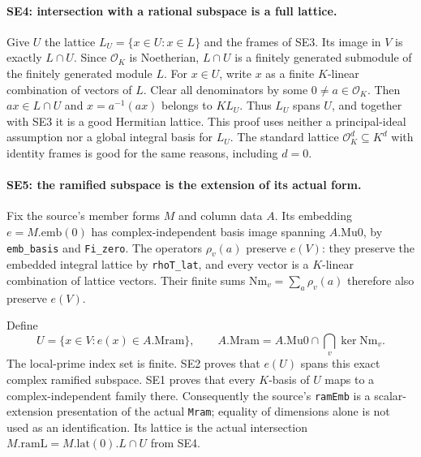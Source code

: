 \paragraph{SE4: intersection with a rational subspace is a full lattice.}
Give $U$ the lattice
$L_U=\{x\in U:x\in L\}$ and the frames of SE3. Its image in $V$ is
exactly $L\cap U$. Since $\mathcal O_K$ is Noetherian, $L\cap U$ is a
finitely generated submodule of the finitely generated module $L$.
For $x\in U$, write $x$ as a finite $K$-linear combination of vectors
of $L$. Clear all denominators by some
$0\ne a\in\mathcal O_K$. Then $ax\in L\cap U$ and
$x=a^{-1}(ax)$ belongs to $KL_U$. Thus $L_U$ spans $U$, and together
with SE3 it is a good Hermitian lattice. This proof uses neither a
principal-ideal assumption nor a global integral basis for $L_U$.
The standard lattice $\mathcal O_K^d\subseteq K^d$ with identity
frames is good for the same reasons, including $d=0$.

\paragraph{SE5: the ramified subspace is the extension of its actual form.}
Fix the source's member forms $M$ and column data $A$. Its embedding
$e=M.\mathrm{emb}(0)$ has complex-independent basis image spanning
$A.\mathrm{Mu0}$, by \texttt{emb\_basis} and \texttt{Fi\_zero}.
The operators $\rho_v(a)$ preserve $e(V)$: they preserve the embedded
integral lattice by \texttt{rhoT\_lat}, and every vector is a
$K$-linear combination of lattice vectors. Their finite sums
$\mathrm{Nm}_v=\sum_a\rho_v(a)$ therefore also preserve $e(V)$.

Define
\[
 U=\{x\in V:e(x)\in A.\mathrm{Mram}\},\qquad
 A.\mathrm{Mram}=A.\mathrm{Mu0}\cap\bigcap_v\ker\mathrm{Nm}_v.
 \tag{SE.6}
\]
The local-prime index set is finite. SE2 proves that $e(U)$ spans this
exact complex ramified subspace. SE1 proves that every $K$-basis of $U$
maps to a complex-independent family there. Consequently the source's
\texttt{ramEmb} is a scalar-extension presentation of the actual
\texttt{Mram}; equality of dimensions alone is not used as an
identification. Its lattice is the actual intersection
$M.\mathrm{ramL}=M.\mathrm{lat}(0).L\cap U$ from SE4.

